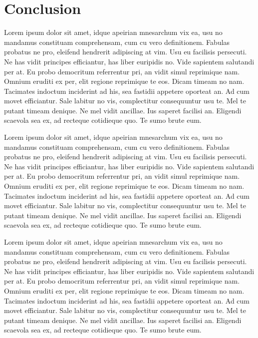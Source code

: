 \chapter{Conclusion}
Lorem ipsum dolor sit amet, idque apeirian mnesarchum vix ea, usu no mandamus constituam comprehensam, cum cu vero definitionem. Fabulas probatus ne pro, eleifend hendrerit adipiscing at vim. Usu eu facilisis persecuti. Ne has vidit principes efficiantur, has liber euripidis no. Vide sapientem salutandi per at. Eu probo democritum referrentur pri, an vidit simul reprimique nam. Omnium eruditi ex per, elit regione reprimique te eos. Dicam timeam no nam. Tacimates indoctum inciderint ad his, sea fastidii appetere oporteat an. Ad cum movet efficiantur. Sale labitur no vis, complectitur consequuntur usu te. Mel te putant timeam denique. Ne mel vidit ancillae. Ius saperet facilisi an. Eligendi scaevola sea ex, ad recteque cotidieque quo. Te sumo brute eum.

Lorem ipsum dolor sit amet, idque apeirian mnesarchum vix ea, usu no mandamus constituam comprehensam, cum cu vero definitionem. Fabulas probatus ne pro, eleifend hendrerit adipiscing at vim. Usu eu facilisis persecuti. Ne has vidit principes efficiantur, has liber euripidis no. Vide sapientem salutandi per at. Eu probo democritum referrentur pri, an vidit simul reprimique nam. Omnium eruditi ex per, elit regione reprimique te eos. Dicam timeam no nam. Tacimates indoctum inciderint ad his, sea fastidii appetere oporteat an. Ad cum movet efficiantur. Sale labitur no vis, complectitur consequuntur usu te. Mel te putant timeam denique. Ne mel vidit ancillae. Ius saperet facilisi an. Eligendi scaevola sea ex, ad recteque cotidieque quo. Te sumo brute eum.

Lorem ipsum dolor sit amet, idque apeirian mnesarchum vix ea, usu no mandamus constituam comprehensam, cum cu vero definitionem. Fabulas probatus ne pro, eleifend hendrerit adipiscing at vim. Usu eu facilisis persecuti. Ne has vidit principes efficiantur, has liber euripidis no. Vide sapientem salutandi per at. Eu probo democritum referrentur pri, an vidit simul reprimique nam. Omnium eruditi ex per, elit regione reprimique te eos. Dicam timeam no nam. Tacimates indoctum inciderint ad his, sea fastidii appetere oporteat an. Ad cum movet efficiantur. Sale labitur no vis, complectitur consequuntur usu te. Mel te putant timeam denique. Ne mel vidit ancillae. Ius saperet facilisi an. Eligendi scaevola sea ex, ad recteque cotidieque quo. Te sumo brute eum.
